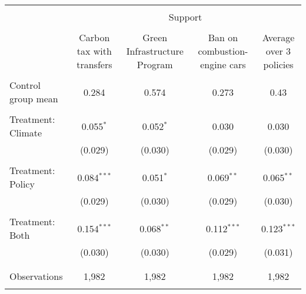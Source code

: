 
\begin{tabular}{@{\extracolsep{5pt}}lcccc} 
\\[-1.8ex]\hline 
\hline \\[-1.8ex] 
 & \multicolumn{4}{c}{Support} \\ 
\cline{2-5} 
\\[-1.8ex] & Carbon tax with transfers & Green Infrastructure Program & Ban on combustion-engine cars & Average over 3 policies \\ 
\hline \\[-1.8ex] 
 Control group mean & 0.284 & 0.574 & 0.273 & 0.43  \\ \hline \\[-1.8ex] Treatment: Climate & 0.055$^{*}$ & 0.052$^{*}$ & 0.030 & 0.030 \\ 
  & (0.029) & (0.030) & (0.029) & (0.030) \\ 
  & & & & \\ 
 Treatment: Policy & 0.084$^{***}$ & 0.051$^{*}$ & 0.069$^{**}$ & 0.065$^{**}$ \\ 
  & (0.029) & (0.030) & (0.029) & (0.030) \\ 
  & & & & \\ 
 Treatment: Both & 0.154$^{***}$ & 0.068$^{**}$ & 0.112$^{***}$ & 0.123$^{***}$ \\ 
  & (0.030) & (0.030) & (0.029) & (0.031) \\ 
  & & & & \\ 
\hline \\[-1.8ex] 

Observations & 1,982 & 1,982 & 1,982 & 1,982 \\ 
\hline 
\hline \\[-1.8ex] 
\end{tabular} 